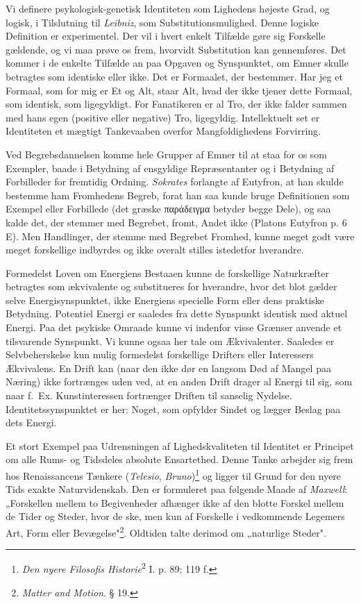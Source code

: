 \documentclass[12pt,a4paper]{book}
\newcommand{\opage}[1]{\marginnote{\footnotesize\textit{[#1]}}}
\newcommand{\apage}[1]{\marginnote{\footnotesize\textit{[#1]}}}
\begin{document}
Vi definere psykologisk-genetisk Identiteten som Lighedens højeste
Grad, og logisk, i Tilslutning til \emph{Leibniz}, som
Substitutionsmulighed. Denne logiske Definition er experimentel. Der
vil i hvert enkelt Tilfælde gøre sig Forskelle gældende, og vi maa
prøve os frem, hvorvidt Substitution kan gennemføres. Det kommer i de
enkelte Tilfælde an paa Opgaven og Synspunktet, om Emner skulle
betragtes som identiske eller ikke. Det er Formaalet, der bestemmer.
Har jeg et Formaal, som for mig er Et og Alt, staar Alt, hvad der ikke
tjener dette Formaal, som identisk, som ligegyldigt. For Fanatikeren er
al Tro, der ikke falder sammen med hans egen (positive eller negative)
Tro, ligegyldig. Intellektuelt set \apage{179} er Identiteten et mægtigt
Tankevaaben overfor Mangfoldighedens Forvirring.

Ved Begrebsdannelsen komme hele Grupper af Emner til at staa for os som
Exempler, baade i Betydning af ensgyldige Repræsentanter og i Betydning
af Forbilleder for fremtidig Ordning. \emph{Sokrates} forlangte af
Eutyfron, at han skulde bestemme ham Fromhedens Begreb, forat han saa
kunde bruge Definitionen som Exempel eller Forbillede (det græske
παράδειγμα betyder begge Dele), og saa kalde det, der stemmer med
Begrebet, fromt, Andet ikke (Platons Eutyfron p. 6 E). Men Handlinger,
der stemme med Begrebet Fromhed, kunne meget godt være meget forskellige indbyrdes og ikke overalt stilles istedetfor hverandre.

Formedelst Loven om Energiens Bestaaen kunne de forskellige
Naturkræfter betragtes som ækvivalente og substitueres for hverandre,
hvor det blot gælder selve Energisynspunktet, ikke Energiens specielle
Form eller dens praktiske Betydning. Potentiel Energi er saaledes fra dette Synspunkt identisk med aktuel Energi. Paa det psykiske Omraade
kunne vi indenfor visse Grænser anvende et tilsvarende Synspunkt. Vi
kunne ogsaa her tale om Ækvivalenter. Saaledes er Selvbeherskelse kun
mulig formedelst forskellige Drifters eller Interessers Ækvivalens. En
Drift kan (naar den ikke dør en langsom Død af Mangel paa Næring) ikke
fortrænges uden ved, at en anden Drift drager al Energi til sig, som
naar f.\ Ex. Kunstinteressen fortrænger Driften til sanselig Nydelse.
Identitetssynspunktet er her: Noget, som opfylder Sindet og lægger
Beslag paa dets Energi.

Et stort Exempel paa Udrensningen af Lighedskvaliteten til Identitet er
Principet om alle Rums- og Tidsdeles absolute Ensartethed. Denne Tanke
arbejder sig frem hos Renaissancens Tænkere (\emph{Telesio},
\emph{Bruno})\footnote{\emph{Den nyere Filosofis
Historie}\textsuperscript{2} I. p. 89; 119 f.} og ligger til Grund for
den nyere Tids exakte Naturvidenskab. Den er formuleret paa følgende
Maade af \emph{Maxwell}: „Forskellen mellem to Begivenheder afhænger ikke af den blotte Forskel mellem de Tider og Steder, hvor de ske, men
kun af Forskelle i vedkommende Legemers \opage{180} Art, Form eller
Bevægelse"\footnote{\emph{Matter and Motion}. § 19.}. Oldtiden talte
derimod om „naturlige Steder".
\end{document}

